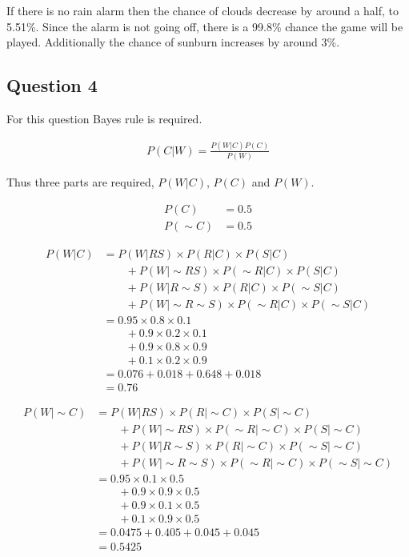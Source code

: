 If there is no rain alarm then the chance of clouds decrease by around a half, to 5.51\%.
Since the alarm is not going off, there is a 99.8\% chance the game will be played.
Additionally the chance of sunburn increases by around 3\%.

\subsection*{Question 4}

For this question Bayes rule is required.

\begin{align*}
    P(C|W) = \frac{P(W|C) P(C)}{P(W)}
\end{align*}

Thus three parts are required, $P(W|C)$, $P(C)$ and $P(W)$.

\begin{align*}
    P(C) &= 0.5\\
    P(\sim C) &= 0.5
\end{align*}

\begin{align*}
    P(W|C) &= P(W|RS) \times P(R|C) \times P(S|C)\\
    &\qquad+ P(W|\sim R S) \times P(\sim R|C) \times P(S|C)\\
    &\qquad+ P(W|R\sim S) \times P(R|C) \times P(\sim S | C)\\
    &\qquad  + P(W| \sim R \sim S) \times P(\sim R | C) \times P(\sim S | C)\\
    &= 0.95 \times 0.8 \times 0.1\\
    &\qquad + 0.9 \times 0.2 \times 0.1\\
    &\qquad + 0.9 \times 0.8 \times 0.9\\
    &\qquad + 0.1 \times 0.2 \times 0.9\\
    &= 0.076 + 0.018 + 0.648 + 0.018\\
    &= 0.76
\end{align*}

\begin{align*}
    P(W|\sim{C}) &= P(W|RS) \times P(R|\sim{C}) \times P(S|\sim{C})\\
    &\qquad+ P(W|\sim{R}S) \times P(\sim{R}|\sim{C}) \times P(S|\sim{C})\\
    &\qquad+ P(W|R\sim{S}) \times P(R|\sim{C}) \times P(\sim{S}|\sim{C})\\
    &\qquad+ P(W|\sim{R}\sim{S}) \times P(\sim{R}|\sim{C}) \times P(\sim{S}|\sim{C})\\
    &= 0.95 \times 0.1 \times 0.5\\
    &\qquad+ 0.9 \times 0.9 \times 0.5\\
    &\qquad+ 0.9 \times 0.1 \times 0.5\\
    &\qquad+ 0.1 \times 0.9 \times 0.5\\
    &= 0.0475 + 0.405 + 0.045 + 0.045\\
    &= 0.5425
\end{align*}

